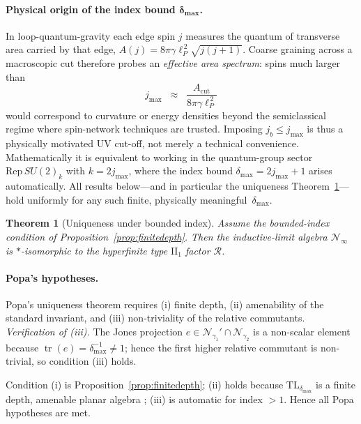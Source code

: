 \documentclass[11pt]{article}
\newtheorem{theorem}{Theorem}[section]
\begin{document}
\paragraph{Physical origin of the index bound $\boldsymbol{\delta_{\max}}$.}
In loop-quantum-gravity each edge spin \(j\) measures the quantum of
transverse area carried by that edge, 
\(A(j)=8\pi\gamma \ell_{\!P}^{\,2}\sqrt{j(j+1)}\).
Coarse graining across a macroscopic cut therefore probes an \emph{effective
area spectrum}: spins much larger than
\[
  j_{\mathrm{max}}
  \;\;\approx\;\;
  \frac{A_{\mathrm{cut}}}{8\pi\gamma\ell_{\!P}^{\,2}}
\]
would correspond to curvature or energy densities beyond the
semiclassical regime where spin-network techniques are trusted.
Imposing \(j_b\le j_{\mathrm{max}}\) is thus a physically motivated UV
cut-off, not merely a technical convenience.  Mathematically it is
equivalent to working in the quantum-group sector
\(\mathrm{Rep}\,SU(2)_k\) with
\(k=2 j_{\mathrm{max}}\), where the index bound
\(\delta_{\max}=2j_{\mathrm{max}}+1\) arises automatically.  All results
below—and in particular the uniqueness
Theorem~\ref{thm:unique}—hold uniformly for any such finite, physically
meaningful~\(\delta_{\max}\).


\begin{theorem}[Uniqueness under bounded index]\label{thm:unique}
Assume the bounded-index condition of Proposition~\ref{prop:finitedepth}.
Then the inductive-limit algebra $\mathcal N_{\infty}$ is
$*$-isomorphic to the hyperfinite type $\mathrm{II}_1$ factor
$\mathcal R$.
\end{theorem}

\paragraph{Popa's hypotheses.}
Popa’s uniqueness theorem requires (i) finite depth,
(ii) amenability of the standard invariant, and
(iii) non-triviality of the relative commutants.
\smallskip
\noindent
\emph{Verification of (iii).}
The Jones projection $e\in\mathcal N_{\gamma_1}'\!\cap\mathcal N_{\gamma_2}$
is a non-scalar element because
$\operatorname{tr}(e)=\delta_{\max}^{-1}\neq1$;
hence the first higher relative commutant is non-trivial, so condition (iii)
holds.

Condition (i) is Proposition~\ref{prop:finitedepth};
(ii) holds because $\mathrm{TL}_{\delta_{\max}}$ is a
finite depth, amenable planar algebra \cite{JonesPA};
(iii) is automatic for index $>1$.  Hence all Popa hypotheses are met.
\end{document}
